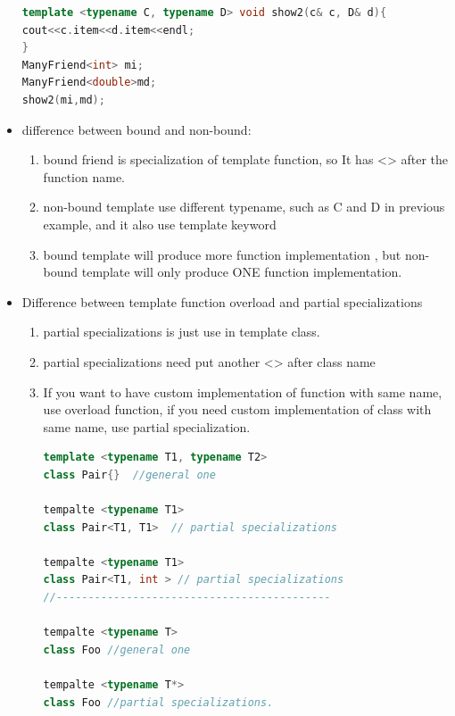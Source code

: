 \documentclass[a4paper,12pt,twoside]{book}
\begin{document}
\begin{itemize}
\begin{lstlisting}[frame=single, language=c++]
template <typename C, typename D> void show2(c& c, D& d){
cout<<c.item<<d.item<<endl;
}
ManyFriend<int> mi;
ManyFriend<double>md;
show2(mi,md);
\end{lstlisting}

\item difference between bound and non-bound:
\begin{enumerate}
\item bound friend is specialization of template function, so It has <> after the function name.
\item non-bound template use different typename, such as C and D in previous example, and it also use template keyword
\item bound template will produce more function implementation , but non-bound template will only produce ONE function implementation.
\end{enumerate}

\item Difference between template function overload and partial specializations
\begin{enumerate}
\item partial specializations is just use in template class.
\item partial specializations need put another <> after class name
\item If you want to have custom implementation of function with same name, use overload function, if you need  custom implementation of class with same name, use partial specialization.
\begin{lstlisting}[frame=single, language=c++]
template <typename T1, typename T2>
class Pair{}  //general one

tempalte <typename T1>
class Pair<T1, T1>  // partial specializations

tempalte <typename T1>
class Pair<T1, int > // partial specializations
//-------------------------------------------

tempalte <typename T>
class Foo //general one

tempalte <typename T*>
class Foo //partial specializations.
\end{lstlisting}

\end{enumerate}

\end{itemize}
\end{document}
